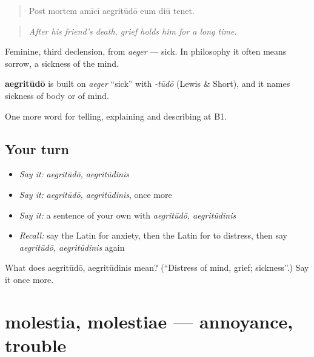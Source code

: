 \begin{quote}
Post mortem amīcī aegritūdō eum diū tenet.
\end{quote}

\begin{quote}
\emph{After his friend's death, grief holds him for a long time.}
\end{quote}

Feminine, third declension, from \emph{aeger} — sick. In philosophy it often means sorrow, a sickness of the mind.

\begin{cousinweb}
\textbf{aegritūdō} is built on \emph{aeger} \textquotedblleft{}sick\textquotedblright{} with \emph{-tūdō} (Lewis \& Short), and it names sickness of body or of mind.
\end{cousinweb}

\begin{grammarlens}[title={What you've built}]
One more word for telling, explaining and describing at B1.
\end{grammarlens}

\subsection*{Your turn}
\begin{itemize}
\raggedright
  \item \emph{Say it:} \emph{aegritūdō, aegritūdinis}
  \item \emph{Say it:} \emph{aegritūdō, aegritūdinis}, once more
  \item \emph{Say it:} a sentence of your own with \emph{aegritūdō, aegritūdinis}
  \item \emph{Recall:} say the Latin for anxiety, then the Latin for to distress, then say \emph{aegritūdō, aegritūdinis} again
\end{itemize}

\begin{tcolorbox}[breakable,colback=teal!4,colframe=teal!35!black,title={Before you move on}]
What does aegritūdō, aegritūdinis mean? (\textquotedblleft{}Distress of mind, grief; sickness\textquotedblright{}.) Say it once more.
\end{tcolorbox}
\section[molestia, molestiae]{molestia, molestiae — annoyance, trouble}

\label{lesson:LA-C497-molestia}




